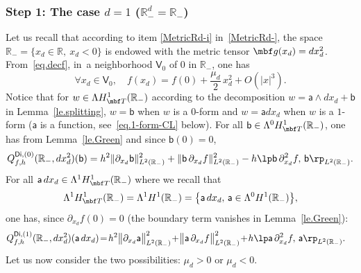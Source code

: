 \subsubsection*{Step 1: The case $d=1$ (\ie $\mathbb R^d_-=\mathbb R_-$)}
Let us recall that according to item \eqref{MetricRd-i} in~\ref{MetricRd-}, the
space $\mathbb R_-=\{x_d\in \mathbb R,\ x_d<0\}$ is endowed with the
metric tensor $\mbf g(x_d)=dx_d^2$.
From~\eqref{eq.decf}, in~a neighborhood $\mathsf V_0$ of $0$ in $\mathbb R_-$, one has
\[
\forall x_d\in \mathsf V_0,\quad f(x_d)= f(0)+ \frac{\mu_{d}}{2}\, x_d^2 +O(|x|^3).
\]
Notice that for $w\in \Lambda H^1_{\mbf T}(\mathbb R_-)$ according to the decomposition $w=\mathsf a\wedge dx_d+\mathsf b$ in Lemma~\ref{le.splitting}, $w=\mathsf b$ when $w$ is a $0$-form and $w=\mathsf a dx_d$ when $w$ is a $1$-form ($\mathsf a$ is a function, see~\eqref{eq.1-form-CL} below).
For all $\mathsf b \in \Lambda^0 H^1_{\mbf T}(\mathbb R_-)$, one has from Lemma~\ref{le.Green} and since $\mathsf b(0)=0$,
\begin{equation}\label{eq.1bb-<}
Q_{f,h}^{\mathsf{Di},(0)}(\mathbb R_-,dx_d^2)(\mathsf b)= h^2 \Vert \partial_{x_d} \mathsf b \Vert_{L^2(\mathbb R_-)}^2+ \Vert \mathsf b\, \partial_{x_d} f \Vert_{L^2(\mathbb R_-)}^2-h\lp \mathsf b \, \partial_{x_d}^2 f, \, \mathsf b \rp_{L^2(\mathbb R_-)}.
\end{equation}
For all $\mathsf a \, dx_d\in \Lambda^1 H^1_{\mbf T}(\mathbb R_-)$ where we recall that
\begin{equation}\label{eq.1-form-CL}
\Lambda^1 H^1_{\mbf T}(\mathbb R_-) =\Lambda^1 H^1(\mathbb R_-)=\big \{\mathsf a \, dx_d,\, \mathsf a \in \Lambda^0 H^1(\mathbb R_-)\big \},
\end{equation}
one has, since $\partial_{x_d} f(0)=0$ (the boundary term vanishes in Lemma~\ref{le.Green}):
\begin{align*}
Q_{f,h}^{\mathsf{Di},(1)}(\mathbb R_-, dx_d^2)(\mathsf a \, dx_d)& \! = \! h^2\big \Vert \partial_{x_d} \mathsf a \big \Vert_{L^2(\mathbb
R_-)}^2
\!+\! \big
\Vert
\mathsf
a\,
\partial_{x_d}
f\big
\Vert_{L^2(\mathbb
R_-)}^2 \!+\! h\lp \mathsf a \, \partial_{x_d}^2 f, \, \mathsf a \rp_{L^2(\mathbb R_-)}.
\end{align*}
Let us now consider the two possibilities: $\mu_d>0$ or $\mu_d < 0$.

